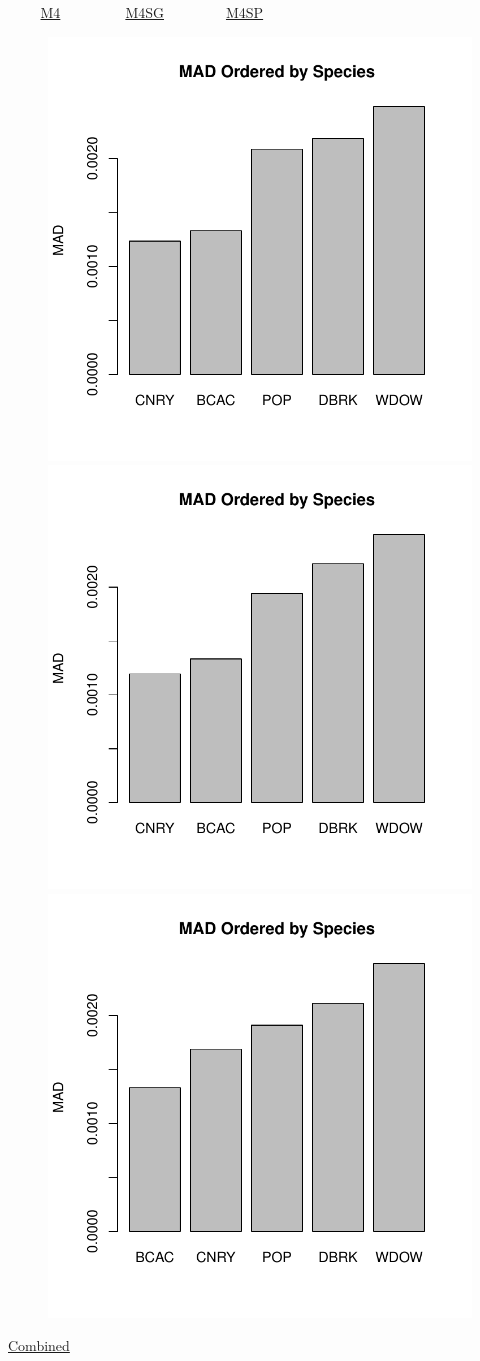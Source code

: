 \documentclass[ xcolor = pdftex, dvipsnames, table ]{beamer}
\begin{document}
%
\begin{frame}{$~~~~~~~~~$ \href{https://github.com/gasduster99/sppComp/tree/master/sscRuns/26919781982M4}{M4} $~~~~~~~~~~~~~~~~~~$ \href{https://github.com/gasduster99/sppComp/tree/master/sscRuns/26919781982M4IGSG}{M4SG} $~~~~~~~~~~~~~~~~~$ \href{https://github.com/gasduster99/sppComp/tree/master/sscRuns/26919781982M4IGSP}{M4SP} }
        \begin{figure}[ht!]
        \centering
        \hspace*{-1cm}
        \includegraphics[width=.4\textwidth]{../sscRuns/26919781982M4/sppTailMad68.pdf}
        \includegraphics[width=.4\textwidth]{../sscRuns/26919781982M4IGSG/sppTailMad68.pdf}
        \includegraphics[width=.4\textwidth]{../sscRuns/26919781982M4IGSP/sppTailMad68.pdf}
        \end{figure}
	\vspace{-1cm}
	\begin{center}
	\Large
	\href{https://github.com/gasduster99/sppComp/tree/master/try1/postSSC/26919781982M4IGSPSG}{Combined}
	\end{center}
\end{frame}
\end{document}
